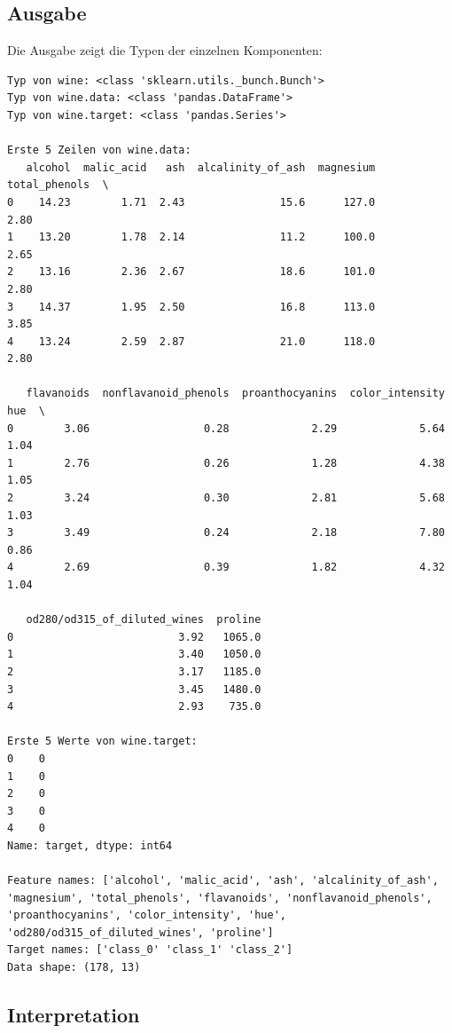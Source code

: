\subsection{Ausgabe}

Die Ausgabe zeigt die Typen der einzelnen Komponenten:

\begin{verbatim}
Typ von wine: <class 'sklearn.utils._bunch.Bunch'>
Typ von wine.data: <class 'pandas.DataFrame'>
Typ von wine.target: <class 'pandas.Series'>

Erste 5 Zeilen von wine.data:
   alcohol  malic_acid   ash  alcalinity_of_ash  magnesium  total_phenols  \
0    14.23        1.71  2.43               15.6      127.0           2.80   
1    13.20        1.78  2.14               11.2      100.0           2.65   
2    13.16        2.36  2.67               18.6      101.0           2.80   
3    14.37        1.95  2.50               16.8      113.0           3.85   
4    13.24        2.59  2.87               21.0      118.0           2.80   

   flavanoids  nonflavanoid_phenols  proanthocyanins  color_intensity   hue  \
0        3.06                  0.28             2.29             5.64  1.04   
1        2.76                  0.26             1.28             4.38  1.05   
2        3.24                  0.30             2.81             5.68  1.03   
3        3.49                  0.24             2.18             7.80  0.86   
4        2.69                  0.39             1.82             4.32  1.04   

   od280/od315_of_diluted_wines  proline  
0                          3.92   1065.0  
1                          3.40   1050.0  
2                          3.17   1185.0  
3                          3.45   1480.0  
4                          2.93    735.0  

Erste 5 Werte von wine.target:
0    0
1    0
2    0
3    0
4    0
Name: target, dtype: int64

Feature names: ['alcohol', 'malic_acid', 'ash', 'alcalinity_of_ash', 'magnesium', 'total_phenols', 'flavanoids', 'nonflavanoid_phenols', 'proanthocyanins', 'color_intensity', 'hue', 'od280/od315_of_diluted_wines', 'proline']
Target names: ['class_0' 'class_1' 'class_2']
Data shape: (178, 13)
\end{verbatim}

\subsection{Interpretation}

